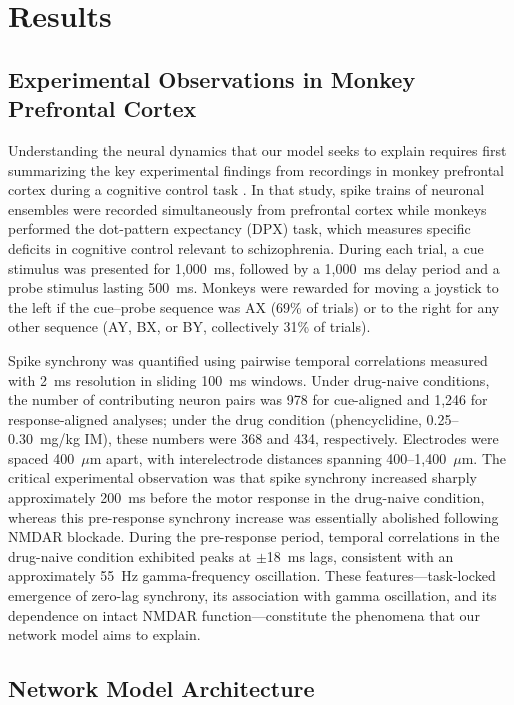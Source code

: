 \documentclass[10pt]{article}
\begin{document}
\section{Results}

\subsection{Experimental Observations in Monkey Prefrontal Cortex}

Understanding the neural dynamics that our model seeks to explain requires first summarizing the key experimental findings from recordings in monkey prefrontal cortex during a cognitive control task \citep{zick2018blocking}. In that study, spike trains of neuronal ensembles were recorded simultaneously from prefrontal cortex while monkeys performed the dot-pattern expectancy (DPX) task, which measures specific deficits in cognitive control relevant to schizophrenia. During each trial, a cue stimulus was presented for 1,000~ms, followed by a 1,000~ms delay period and a probe stimulus lasting 500~ms. Monkeys were rewarded for moving a joystick to the left if the cue--probe sequence was AX (69\% of trials) or to the right for any other sequence (AY, BX, or BY, collectively 31\% of trials).

Spike synchrony was quantified using pairwise temporal correlations measured with 2~ms resolution in sliding 100~ms windows. Under drug-naive conditions, the number of contributing neuron pairs was 978 for cue-aligned and 1,246 for response-aligned analyses; under the drug condition (phencyclidine, 0.25--0.30~mg/kg IM), these numbers were 368 and 434, respectively. Electrodes were spaced 400~$\mu$m apart, with interelectrode distances spanning 400--1,400~$\mu$m. The critical experimental observation was that spike synchrony increased sharply approximately 200~ms before the motor response in the drug-naive condition, whereas this pre-response synchrony increase was essentially abolished following NMDAR blockade. During the pre-response period, temporal correlations in the drug-naive condition exhibited peaks at $\pm$18~ms lags, consistent with an approximately 55~Hz gamma-frequency oscillation. These features---task-locked emergence of zero-lag synchrony, its association with gamma oscillation, and its dependence on intact NMDAR function---constitute the phenomena that our network model aims to explain.

\subsection{Network Model Architecture}
\end{document}
